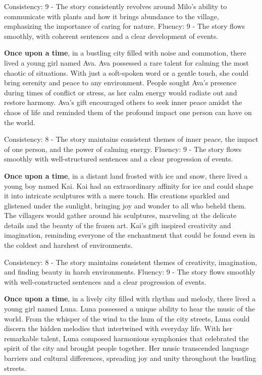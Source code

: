 \documentclass{article}
\begin{document}
Consistency: 9 - The story consistently revolves around Milo's ability to communicate with plants and how it brings abundance to the village, emphasizing the importance of caring for nature.
Fluency: 9 - The story flows smoothly, with coherent sentences and a clear development of events.

\textbf{Once upon a time}, in a bustling city filled with noise and commotion, there lived a young girl named Ava. Ava possessed a rare talent for calming the most chaotic of situations. With just a soft-spoken word or a gentle touch, she could bring serenity and peace to any environment. People sought Ava's presence during times of conflict or stress, as her calm energy would radiate out and restore harmony. Ava's gift encouraged others to seek inner peace amidst the chaos of life and reminded them of the profound impact one person can have on the world.

Consistency: 8 - The story maintains consistent themes of inner peace, the impact of one person, and the power of calming energy.
Fluency: 9 - The story flows smoothly with well-structured sentences and a clear progression of events.

\textbf{Once upon a time}, in a distant land frosted with ice and snow, there lived a young boy named Kai. Kai had an extraordinary affinity for ice and could shape it into intricate sculptures with a mere touch. His creations sparkled and glistened under the sunlight, bringing joy and wonder to all who beheld them. The villagers would gather around his sculptures, marveling at the delicate details and the beauty of the frozen art. Kai's gift inspired creativity and imagination, reminding everyone of the enchantment that could be found even in the coldest and harshest of environments.

Consistency: 8 - The story maintains consistent themes of creativity, imagination, and finding beauty in harsh environments.
Fluency: 9 - The story flows smoothly with well-constructed sentences and a clear progression of events.

\textbf{Once upon a time}, in a lively city filled with rhythm and melody, there lived a young girl named Luna. Luna possessed a unique ability to hear the music of the world. From the whisper of the wind to the hum of the city streets, Luna could discern the hidden melodies that intertwined with everyday life. With her remarkable talent, Luna composed harmonious symphonies that celebrated the spirit of the city and brought people together. Her music transcended language barriers and cultural differences, spreading joy and unity throughout the bustling streets.
\end{document}
